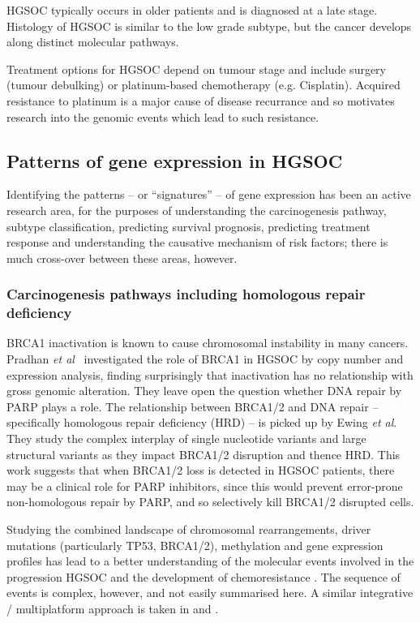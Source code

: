 \documentclass[draft,tikz, 12pt,a4paper,oneside,fleqn]{article}
\newcommand{\etal}{{\em et al\/}}
\begin{document}
HGSOC typically occurs in older patients and is diagnosed at a late stage.   Histology of HGSOC is similar to the low grade subtype, but the cancer develops along distinct molecular pathways. 

Treatment options for HGSOC depend on tumour stage and include surgery (tumour debulking) or platinum-based chemotherapy (e.g. Cisplatin).  Acquired resistance to platinum is a major cause of disease recurrance\cite{Patch2015} and so motivates research into the genomic events which lead to such resistance.


\subsection{Patterns of gene expression in HGSOC}

Identifying the patterns -- or ``signatures'' -- of gene expression has been an active research area, for the purposes of understanding the carcinogenesis pathway, subtype classification, predicting survival prognosis, predicting treatment response and understanding the causative mechanism of risk factors; there is much cross-over between these areas, however.

\subsubsection{Carcinogenesis pathways including homologous repair deficiency}

BRCA1 inactivation is known to cause chromosomal instability in many cancers.  Pradhan \etal\ \cite{Pradhan2010} investigated the role of BRCA1 in HGSOC by copy number and expression analysis, finding surprisingly that inactivation has no relationship with gross genomic alteration.  They leave open the question whether DNA repair by PARP plays a role.   The relationship between BRCA1/2 and DNA repair -- specifically homologous repair deficiency (HRD) -- is picked up by Ewing \etal \cite{Ewing2020}.  They study the complex interplay of single nucleotide variants and large structural variants as they impact BRCA1/2 disruption and thence HRD.  This work suggests that when BRCA1/2 loss is detected in HGSOC patients, there may be a clinical role for PARP inhibitors, since this would prevent error-prone non-homologous repair by PARP, and so selectively kill BRCA1/2 disrupted cells.

Studying the combined landscape of chromosomal rearrangements, driver mutations (particularly TP53, BRCA1/2), methylation and gene expression profiles has lead to a better understanding of the molecular events involved in the progression HGSOC and the development of chemoresistance \cite{Patch2015}.  The sequence of events is complex, however, and not easily summarised here.   A similar integrative / multiplatform approach is taken in \cite{He2017a} and \cite{Hoadley2014}.
\end{document}

